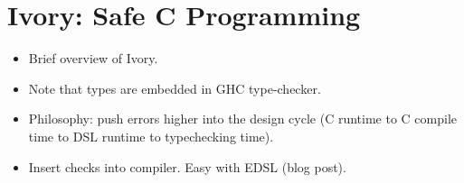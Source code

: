 \section{Ivory: Safe C Programming}

\begin{itemize}
\item Brief overview of Ivory.
\item Note that types are embedded in GHC type-checker.
\item Philosophy: push errors higher into the design cycle (C runtime to C
  compile time to DSL runtime to typechecking time).
\item Insert checks into compiler.  Easy with EDSL  (blog post).
\end{itemize}

